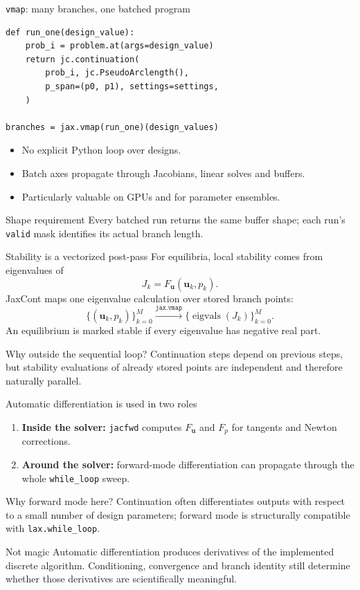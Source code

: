 \documentclass[aspectratio=169,10pt]{beamer}
\newcommand{\state}{\bm{u}}
\begin{document}
\begin{frame}[fragile]{\texttt{vmap}: many branches, one batched program}
\begin{lstlisting}
def run_one(design_value):
    prob_i = problem.at(args=design_value)
    return jc.continuation(
        prob_i, jc.PseudoArclength(),
        p_span=(p0, p1), settings=settings,
    )

branches = jax.vmap(run_one)(design_values)
\end{lstlisting}
\begin{itemize}
  \item No explicit Python loop over designs.
  \item Batch axes propagate through Jacobians, linear solves and buffers.
  \item Particularly valuable on GPUs and for parameter ensembles.
\end{itemize}
\begin{alertblock}{Shape requirement}
Every batched run returns the same buffer shape; each run's \texttt{valid} mask identifies its actual branch length.
\end{alertblock}
\end{frame}

\begin{frame}{Stability is a vectorized post-pass}
For equilibria, local stability comes from eigenvalues of
\[
  J_k=F_{\state}(\state_k,p_k).
\]
JaxCont maps one eigenvalue calculation over stored branch points:
\[
  \{(\state_k,p_k)\}_{k=0}^{M}
  \xrightarrow{\texttt{jax.vmap}}
  \{\operatorname{eigvals}(J_k)\}_{k=0}^{M}.
\]
An equilibrium is marked stable if every eigenvalue has negative real part.
\begin{block}{Why outside the sequential loop?}
Continuation steps depend on previous steps, but stability evaluations of already stored points are independent and therefore naturally parallel.
\end{block}
\end{frame}

\begin{frame}{Automatic differentiation is used in two roles}
\begin{enumerate}
  \item \textbf{Inside the solver:} \texttt{jacfwd} computes $F_{\state}$ and $F_p$ for tangents and Newton corrections.
  \item \textbf{Around the solver:} forward-mode differentiation can propagate through the whole \texttt{while\_loop} sweep.
\end{enumerate}
\begin{block}{Why forward mode here?}
Continuation often differentiates outputs with respect to a small number of design parameters; forward mode is structurally compatible with \texttt{lax.while\_loop}.
\end{block}
\begin{alertblock}{Not magic}
Automatic differentiation produces derivatives of the implemented discrete algorithm. Conditioning, convergence and branch identity still determine whether those derivatives are scientifically meaningful.
\end{alertblock}
\end{frame}
\end{document}
